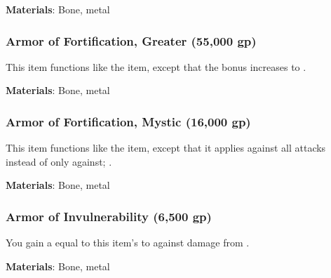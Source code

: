 \vspace{0.25em}
\textbf{Materials}: Bone, metal


\lowercase{\hypertarget{item:Armor of Fortification, Greater}{}}\label{item:Armor of Fortification, Greater}
\hypertarget{item:Armor of Fortification, Greater}{\subsubsection{Armor of Fortification, Greater\hfill{} (55,000 gp)}}

This item functions like the  item, except that the bonus increases to .



\vspace{0.25em}
\textbf{Materials}: Bone, metal


\lowercase{\hypertarget{item:Armor of Fortification, Mystic}{}}\label{item:Armor of Fortification, Mystic}
\hypertarget{item:Armor of Fortification, Mystic}{\subsubsection{Armor of Fortification, Mystic\hfill{} (16,000 gp)}}

This item functions like the  item, except that it applies against all attacks instead of only against; .



\vspace{0.25em}
\textbf{Materials}: Bone, metal


\lowercase{\hypertarget{item:Armor of Invulnerability}{}}\label{item:Armor of Invulnerability}
\hypertarget{item:Armor of Invulnerability}{\subsubsection{Armor of Invulnerability\hfill{} (6,500 gp)}}

You gain a  equal to this item's  to  against damage from .



\vspace{0.25em}
\textbf{Materials}: Bone, metal


